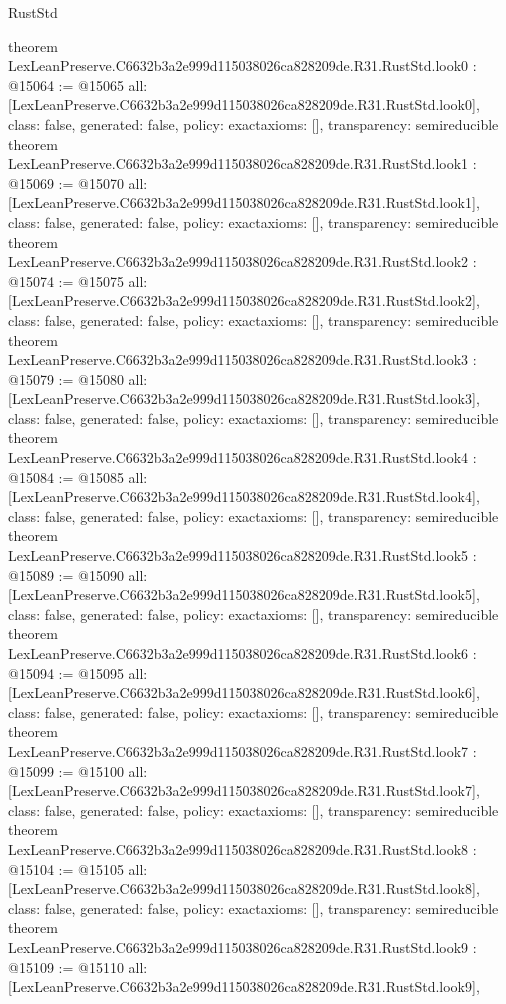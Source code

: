\begin{lexlean}{RustStd}
\begin{coremodule}
{}
theorem LexLeanPreserve.C6632b3a2e999d115038026ca828209de.R31.RustStd.look0 : @15064 := @15065 {
  all: [LexLeanPreserve.C6632b3a2e999d115038026ca828209de.R31.RustStd.look0],
  class: false,
  generated: false,
  policy: exact{axioms: []},
  transparency: semireducible
}
theorem LexLeanPreserve.C6632b3a2e999d115038026ca828209de.R31.RustStd.look1 : @15069 := @15070 {
  all: [LexLeanPreserve.C6632b3a2e999d115038026ca828209de.R31.RustStd.look1],
  class: false,
  generated: false,
  policy: exact{axioms: []},
  transparency: semireducible
}
theorem LexLeanPreserve.C6632b3a2e999d115038026ca828209de.R31.RustStd.look2 : @15074 := @15075 {
  all: [LexLeanPreserve.C6632b3a2e999d115038026ca828209de.R31.RustStd.look2],
  class: false,
  generated: false,
  policy: exact{axioms: []},
  transparency: semireducible
}
theorem LexLeanPreserve.C6632b3a2e999d115038026ca828209de.R31.RustStd.look3 : @15079 := @15080 {
  all: [LexLeanPreserve.C6632b3a2e999d115038026ca828209de.R31.RustStd.look3],
  class: false,
  generated: false,
  policy: exact{axioms: []},
  transparency: semireducible
}
theorem LexLeanPreserve.C6632b3a2e999d115038026ca828209de.R31.RustStd.look4 : @15084 := @15085 {
  all: [LexLeanPreserve.C6632b3a2e999d115038026ca828209de.R31.RustStd.look4],
  class: false,
  generated: false,
  policy: exact{axioms: []},
  transparency: semireducible
}
theorem LexLeanPreserve.C6632b3a2e999d115038026ca828209de.R31.RustStd.look5 : @15089 := @15090 {
  all: [LexLeanPreserve.C6632b3a2e999d115038026ca828209de.R31.RustStd.look5],
  class: false,
  generated: false,
  policy: exact{axioms: []},
  transparency: semireducible
}
theorem LexLeanPreserve.C6632b3a2e999d115038026ca828209de.R31.RustStd.look6 : @15094 := @15095 {
  all: [LexLeanPreserve.C6632b3a2e999d115038026ca828209de.R31.RustStd.look6],
  class: false,
  generated: false,
  policy: exact{axioms: []},
  transparency: semireducible
}
theorem LexLeanPreserve.C6632b3a2e999d115038026ca828209de.R31.RustStd.look7 : @15099 := @15100 {
  all: [LexLeanPreserve.C6632b3a2e999d115038026ca828209de.R31.RustStd.look7],
  class: false,
  generated: false,
  policy: exact{axioms: []},
  transparency: semireducible
}
theorem LexLeanPreserve.C6632b3a2e999d115038026ca828209de.R31.RustStd.look8 : @15104 := @15105 {
  all: [LexLeanPreserve.C6632b3a2e999d115038026ca828209de.R31.RustStd.look8],
  class: false,
  generated: false,
  policy: exact{axioms: []},
  transparency: semireducible
}
theorem LexLeanPreserve.C6632b3a2e999d115038026ca828209de.R31.RustStd.look9 : @15109 := @15110 {
  all: [LexLeanPreserve.C6632b3a2e999d115038026ca828209de.R31.RustStd.look9],
}
\end{coremodule}
\end{lexlean}
